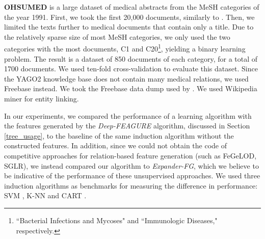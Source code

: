\documentclass[twoside,11pt]{article}
\theoremstyle{definition}
\begin{document}
\textbf{OHSUMED}  is a large dataset of medical abstracts from the MeSH categories of the year 1991. 
First, we took the first 20,000 documents, similarly to .
Then, we limited the texts further to medical documents that contain only a title. %
Due to the relatively sparse size of most MeSH categories, we only used the two categories with the most documents, C1 and C20\footnote{``Bacterial Infections and Mycoses" and ``Immunologic Diseases," respectively.}, yielding a binary learning problem.
The result is a dataset of 850 documents of each category, for a total of 1700 documents.
We used ten-fold cross-validation to evaluate this dataset.
Since the YAGO2 knowledge base does not contain many medical relations, we used Freebase instead. We took the Freebase data dump used by .
We used Wikipedia miner \cite{milne2013open} for entity linking. 

In our experiments, we compared the performance of a learning algorithm with the features generated by the \emph{Deep-FEAGURE} algorithm, discussed in Section \ref{tree_usage}, to the baseline of the same induction algorithm without the constructed features. In addition, since we could not obtain the code of competitive approaches for relation-based feature generation (such as FeGeLOD, SGLR), we instead compared our algorithm to \emph{Expander-FG}, which we believe to be indicative of the performance of these unsupervised approaches.
We used three induction algorithms as benchmarks for measuring the difference in performance: SVM \cite{cortes1995support}, K-NN \cite{fix1951discriminatory} and CART \cite{breiman1984classification}.


 
\end{document}
